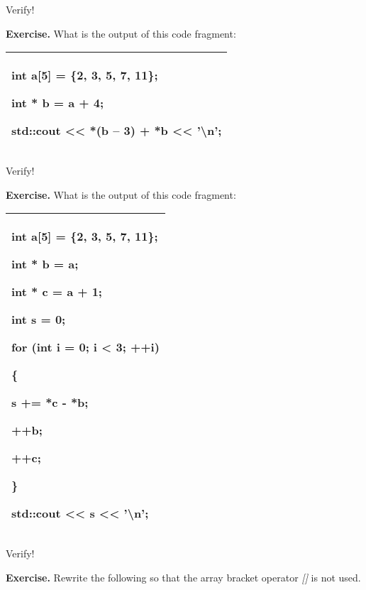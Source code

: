 \documentclass[
]{article}
\begin{document}
Verify!

\textbf{Exercise.} What is the output of this code fragment:

\begin{longtable}[]{@{}l@{}}
\toprule
\endhead
\begin{minipage}[t]{0.97\columnwidth}\raggedright
int a{[}5{]} = \{2, 3, 5, 7, 11\};

int * b = a + 4;

std::cout \textless\textless{} *(b -- 3) + *b \textless\textless{}
'\textbackslash n';\strut
\end{minipage}\tabularnewline
\bottomrule
\end{longtable}

Verify!

\textbf{Exercise.} What is the output of this code fragment:

\begin{longtable}[]{@{}l@{}}
\toprule
\endhead
\begin{minipage}[t]{0.97\columnwidth}\raggedright
int a{[}5{]} = \{2, 3, 5, 7, 11\};

int * b = a;

int * c = a + 1;

int s = 0;

for (int i = 0; i \textless{} 3; ++i)

\{

s += *c - *b;

++b;

++c;

\}

std::cout \textless\textless{} s \textless\textless{}
'\textbackslash n';\strut
\end{minipage}\tabularnewline
\bottomrule
\end{longtable}

Verify!

\textbf{Exercise.} Rewrite the following so that the array bracket
operator \emph{{[}{]}} is not used.
\end{document}
